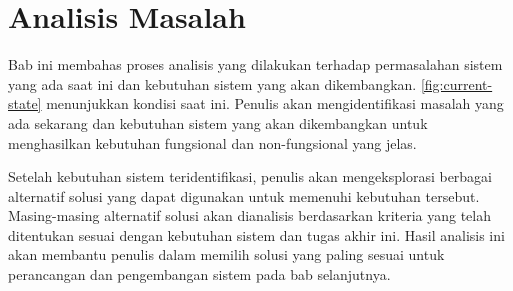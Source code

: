 \chapter{Analisis Masalah}
\label{chap:analisis-masalah}
Bab ini membahas proses analisis yang dilakukan terhadap permasalahan sistem yang ada saat ini dan kebutuhan sistem yang akan dikembangkan. \autoref{fig:current-state} menunjukkan kondisi saat ini. Penulis akan mengidentifikasi masalah yang ada sekarang dan kebutuhan sistem yang akan dikembangkan untuk menghasilkan kebutuhan fungsional dan non-fungsional yang jelas. 

Setelah kebutuhan sistem teridentifikasi, penulis akan mengeksplorasi berbagai alternatif solusi yang dapat digunakan untuk memenuhi kebutuhan tersebut. Masing-masing alternatif solusi akan dianalisis berdasarkan kriteria yang telah ditentukan sesuai dengan kebutuhan sistem dan tugas akhir ini. Hasil analisis ini akan membantu penulis dalam memilih solusi yang paling sesuai untuk perancangan dan pengembangan sistem pada bab selanjutnya.





